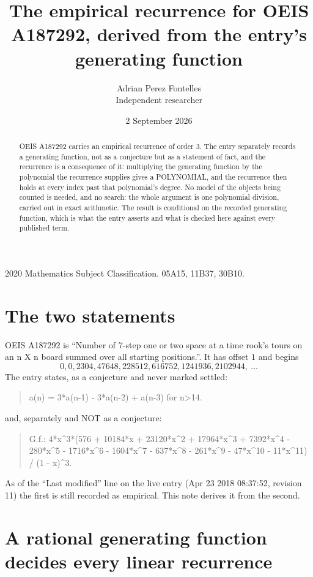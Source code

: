 \documentclass[11pt,a4paper]{article}
\title{The empirical recurrence for OEIS A187292, derived from the entry's generating function}
\author{Adrian Perez Fontelles\\ \small Independent researcher}
\date{2 September 2026}
\theoremstyle{plain}
\theoremstyle{definition}
\begin{document}
\maketitle

\begin{abstract}
OEIS A187292 carries an empirical recurrence of order $3$. The entry separately records a
generating function, not as a conjecture but as a statement of fact, and the recurrence is a
consequence of it: multiplying the generating function by the polynomial the recurrence
supplies gives a POLYNOMIAL, and the recurrence then holds at every index past that
polynomial's degree. No model of the objects being counted is needed, and no search: the
whole argument is one polynomial division, carried out in exact arithmetic. The result is
conditional on the recorded generating function, which is what the entry asserts and what is
checked here against every published term.
\end{abstract}

\noindent\small 2020 Mathematics Subject Classification. 05A15, 11B37, 30B10.\normalsize

\section{The two statements}

OEIS A187292 is ``Number of 7-step one or two space at a time rook's tours on an n X n board summed over all starting positions.''. It has offset $1$ and begins
\[
0, 0, 2304, 47648, 228512, 616752, 1241936, 2102944,\ \dots
\]
The entry states, as a conjecture and never marked settled:
\begin{quote}
a(n) = 3*a(n-1) - 3*a(n-2) + a(n-3) for n>14.
\end{quote}
and, separately and NOT as a conjecture:
\begin{quote}
G.f.: 4*x\^{}3*(576 + 10184*x + 23120*x\^{}2 + 17964*x\^{}3 + 7392*x\^{}4 - 280*x\^{}5 - 1716*x\^{}6 - 1604*x\^{}7 - 637*x\^{}8 - 261*x\^{}9 - 47*x\^{}10 - 11*x\^{}11) / (1 - x)\^{}3.
\end{quote}
As of the ``Last modified'' line on the live entry (Apr 23 2018 08:37:52, revision 11) the first is still
recorded as empirical. This note derives it from the second.

\section{A rational generating function decides every linear recurrence}
\end{document}
